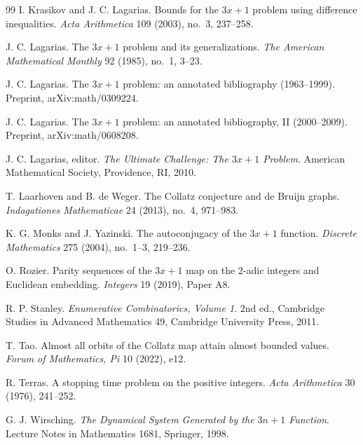 \documentclass[11pt]{amsart}
\theoremstyle{definition}
\theoremstyle{remark}
\begin{document}
\begin{thebibliography}{99}
I. Krasikov and J. C. Lagarias.
Bounds for the $3x+1$ problem using difference inequalities.
\emph{Acta Arithmetica} 109 (2003), no.~3, 237--258.

J. C. Lagarias.
The $3x+1$ problem and its generalizations.
\emph{The American Mathematical Monthly} 92 (1985), no.~1, 3--23.

J. C. Lagarias.
The $3x+1$ problem: an annotated bibliography (1963--1999).
Preprint, arXiv:math/0309224.

J. C. Lagarias.
The $3x+1$ problem: an annotated bibliography, II (2000--2009).
Preprint, arXiv:math/0608208.

J. C. Lagarias, editor.
\emph{The Ultimate Challenge: The $3x+1$ Problem}.
American Mathematical Society, Providence, RI, 2010.

T. Laarhoven and B. de Weger.
The Collatz conjecture and de Bruijn graphs.
\emph{Indagationes Mathematicae} 24 (2013), no.~4, 971--983.

K. G. Monks and J. Yazinski.
The autoconjugacy of the $3x+1$ function.
\emph{Discrete Mathematics} 275 (2004), no.~1--3, 219--236.

O. Rozier.
Parity sequences of the $3x+1$ map on the $2$-adic integers and Euclidean embedding.
\emph{Integers} 19 (2019), Paper A8.

R. P. Stanley.
\emph{Enumerative Combinatorics, Volume 1}.
2nd ed., Cambridge Studies in Advanced Mathematics 49, Cambridge University Press, 2011.

T. Tao.
Almost all orbits of the Collatz map attain almost bounded values.
\emph{Forum of Mathematics, Pi} 10 (2022), e12.

R. Terras.
A stopping time problem on the positive integers.
\emph{Acta Arithmetica} 30 (1976), 241--252.

G. J. Wirsching.
\emph{The Dynamical System Generated by the $3n+1$ Function}.
Lecture Notes in Mathematics 1681, Springer, 1998.

\end{thebibliography}
\end{document}
